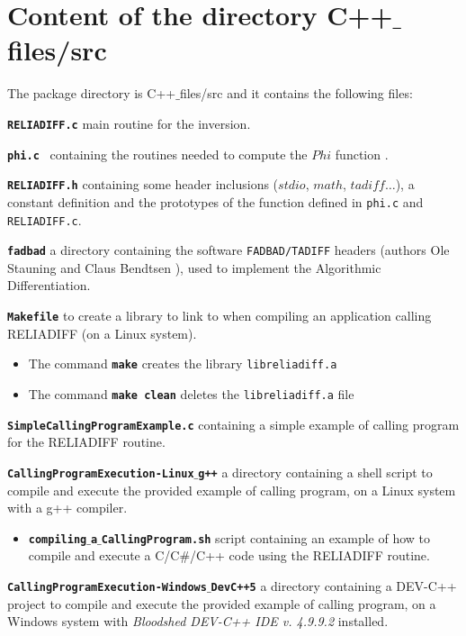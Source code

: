 \documentclass[10pt]{article}
\begin{document}
\section{Content of the directory C++$\_$files/src}

The package directory is C++$\_$files/src and it contains the following files:

\begin{description}
\item  {\bf {\tt RELIADIFF.c}} 	 	 main routine for the inversion.
\item {\bf {\tt phi.c	}} 	containing the routines needed to compute the $Phi$ function \cite{RELART}.
\item {\bf {\tt RELIADIFF.h}}	 		containing some header inclusions ($stdio$, $math$, $tadiff\ldots$), a constant
definition and the prototypes of the function defined in {\tt phi.c} and {\tt RELIADIFF.c}.
\item {\bf {\tt fadbad}}  			a directory containing the software {\tt FADBAD/TADIFF} headers (authors Ole
Stauning and Claus Bendtsen \cite{2}), used to implement the Algorithmic Differentiation.
\item
{\bf {\tt Makefile}}   		to create a library to link to when compiling an application calling RELIADIFF (on a Linux system).
 \begin{itemize}
\item The command {\bf {\tt make}} creates the library {\tt libreliadiff.a}
\item The command {\bf {\tt make clean}} deletes the {\tt libreliadiff.a} file
\end{itemize}
\item {\bf {\tt SimpleCallingProgramExample.c}} 	containing a simple example of calling program for the RELIADIFF routine.
\item
{\bf  {\tt CallingProgramExecution-Linux$\_$g++}} 	a directory containing a shell script to compile and execute the provided example of calling program, on a Linux system with a g++ compiler.
 \begin{itemize}
\item
{\bf {\tt compiling$\_$a$\_$CallingProgram.sh}} 	script containing an example of how to compile and execute a C/C$\#$/C++ code using the RELIADIFF routine.
\end{itemize}
\item {\bf  {\tt CallingProgramExecution-Windows$\_$DevC++5}}  	a directory containing a DEV-C++ project to compile and execute the provided example of calling program, on a Windows system with {\em Bloodshed DEV-C++ IDE v. 4.9.9.2} installed. \begin{itemize}

\end{itemize}
\end{description}
\end{document}
